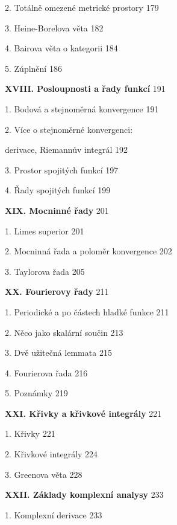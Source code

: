 \documentclass[12pt]{article}
\begin{document}
 \hskip5mm 2. Totálně omezené metrické prostory \hskip10mm 179
 
 \hskip5mm 3. Heine-Borelova věta  \hskip10mm 182
 
 \hskip5mm 4. Bairova věta o kategorii \hskip10mm 184
 
 \hskip5mm 5.  Zúplnění \hskip10mm 186
 
 \bigskip
 
 {\bf XVIII. Posloupnosti a řady funkcí} \hskip10mm 191
 
 \hskip5mm 1. Bodová a stejnoměrná konvergence  \hskip10mm 191
 
 \hskip5mm 2. Více o stejnoměrné konvergenci: 
 
 \hskip10mm derivace, Riemannův integrál \hskip10mm 192
 
 \hskip5mm 3. Prostor spojitých funkcí \hskip10mm 197
 
 \hskip5mm 4. Řady spojitých funkcí \hskip10mm 199
 
 \bigskip
 
 {\bf XIX. Mocninné řady} \hskip10mm 201
 
 \hskip5mm 1. Limes superior \hskip10mm 201
 
 \hskip5mm 2. Mocninná řada a poloměr konvergence \hskip10mm 202
 
 \hskip5mm 3. Taylorova řada \hskip10mm 205
 
 \bigskip
 
 {\bf XX. Fourierovy řady} \hskip10mm 211
 
 \hskip5mm 1. Periodické a po částech hladké funkce \hskip10mm 211
 
 \hskip5mm 2. Něco jako skalární součin \hskip10mm 213
 
 \hskip5mm 3. Dvě užitečná lemmata \hskip10mm 215
 
 \hskip5mm 4. Fourierova řada \hskip10mm 216
 
 \hskip5mm 5. Poznámky \hskip10mm 219
 
 \bigskip
 
 {\bf XXI. Křivky a křivkové integrály} \hskip10mm 221
 
 \hskip5mm 1. Křivky \hskip10mm 221
 
 \hskip5mm 2. Křivkové integrály \hskip10mm 224
 
 \hskip5mm 3. Greenova věta \hskip10mm 228
 
 \bigskip
 
 {\bf XXII. Základy komplexní analysy} \hskip10mm 233
 
 \hskip5mm 1. Komplexní derivace \hskip10mm 233
 
\end{document}
